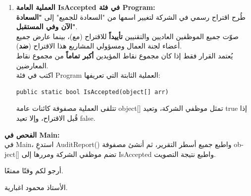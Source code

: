 \documentclass[14pt]{extarticle}
\begin{document}
\begin{enumerate}[label=\textbf{تمرين \arabic*:}, wide=0pt, itemsep=2.2em]
\begin{enumerate}[label=\textbf{(\arabic*)}]
        \item \textbf{العملية العامة \textenglish{IsAccepted} في فئة \textenglish{Program}:} \\
        طُرح اقتراح رسمي في الشركة لتغيير اسمها من "السعادة للجميع" إلى \textbf{"السعادة الآن وفي المستقبل"}. \\
        صوّت جميع الموظفين العاديين والتقنيين \textbf{تأييداً} للاقتراح (مع)، بينما عارض جميع أعضاء لجنة العمال ومسؤولي المشاريع هذا الاقتراح (\textbf{ضد}). \\
        يُعتمد القرار فقط إذا كان مجموع نقاط المؤيدين \textbf{أكبر تماماً} من مجموع نقاط المعارضين. \\
        اكتب في فئة \textenglish{Program} العملية الثابتة التي تعريفها:
        \begin{boxCode}
        \begin{english}
        \begin{verbatim}
public static bool IsAccepted(object[] arr)
        \end{verbatim}
        \end{english}
        \end{boxCode}
        تتلقى العملية مصفوفة كائنات عامة \textenglish{object[]} تمثل موظفي الشركة، وتعيد \textenglish{true} إذا قُبل الاقتراح، وإلا تعيد \textenglish{false}.
    \end{enumerate}
    \textbf{الفحص في \textenglish{Main}:} \\
    في \textenglish{Main}، استدعِ \textenglish{AuditReport()} واطبع جميع أسطر التقرير، ثم أنشئ مصفوفة \textenglish{object[]} تضم موظفي الشركة ومررها إلى \textenglish{IsAccepted} واطبع نتيجة التصويت.
    \filbreak

\end{enumerate}

\vspace{1cm}
\begin{flushleft}
أرجو لكم وقتًا ممتعًا.

الأستاذ محمود اغبارية.
\end{flushleft}
\end{document}
